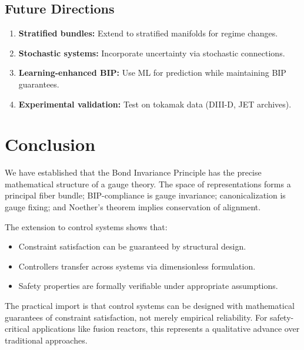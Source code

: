 \documentclass[11pt]{article}
\begin{document}
\subsection{Future Directions}

\begin{enumerate}
    \item \textbf{Stratified bundles:} Extend to stratified manifolds for regime changes.
    \item \textbf{Stochastic systems:} Incorporate uncertainty via stochastic connections.
    \item \textbf{Learning-enhanced BIP:} Use ML for prediction while maintaining BIP guarantees.
    \item \textbf{Experimental validation:} Test on tokamak data (DIII-D, JET archives).
\end{enumerate}

\section{Conclusion}

We have established that the Bond Invariance Principle has the precise mathematical structure
of a gauge theory. The space of representations forms a principal fiber bundle; BIP-compliance
is gauge invariance; canonicalization is gauge fixing; and Noether's theorem implies conservation
of alignment.

The extension to control systems shows that:
\begin{itemize}
    \item Constraint satisfaction can be guaranteed by structural design.
    \item Controllers transfer across systems via dimensionless formulation.
    \item Safety properties are formally verifiable under appropriate assumptions.
\end{itemize}

The practical import is that control systems can be designed with mathematical guarantees
of constraint satisfaction, not merely empirical reliability. For safety-critical applications like
fusion reactors, this represents a qualitative advance over traditional approaches.

\appendix
\end{document}

